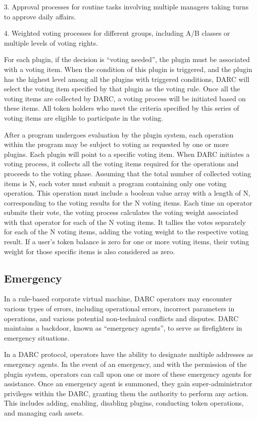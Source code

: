 \documentclass[main.tex]{subfiles}
\begin{document}
3. Approval processes for routine tasks involving multiple managers taking turns to approve daily affairs.

4. Weighted voting processes for different groups, including A/B classes or multiple levels of voting rights.

For each plugin, if the decision is ``voting needed'', the plugin must be associated with a voting item. When the condition of this plugin is triggered, and the plugin has the highest level among all the plugins with triggered conditions, DARC will select the voting item specified by that plugin as the voting rule. Once all the voting items are collected by DARC, a voting process will be initiated based on these items. All token holders who meet the criteria specified by this series of voting items are eligible to participate in the voting.

After a program undergoes evaluation by the plugin system, each operation within the program may be subject to voting as requested by one or more plugins. Each plugin will point to a specific voting item. When DARC initiates a voting process, it collects all the voting items required for the operations and proceeds to the voting phase. Assuming that the total number of collected voting items is N, each voter must submit a program containing only one voting operation. This operation must include a boolean value array with a length of N, corresponding to the voting results for the N voting items. Each time an operator submits their vote, the voting process calculates the voting weight associated with that operator for each of the N voting items. It tallies the votes separately for each of the N voting items, adding the voting weight to the respective voting result. If a user's token balance is zero for one or more voting items, their voting weight for those specific items is also considered as zero.

\subsection{Emergency}

In a rule-based corporate virtual machine, DARC operators may encounter various types of errors, including operational errors, incorrect parameters in operations, and various potential non-technical conflicts and disputes. DARC maintains a backdoor, known as ``emergency agents'', to serve as firefighters in emergency situations.

In a DARC protocol, operators have the ability to designate multiple addresses as emergency agents. In the event of an emergency, and with the permission of the plugin system, operators can call upon one or more of these emergency agents for assistance. Once an emergency agent is summoned, they gain super-administrator privileges within the DARC, granting them the authority to perform any action. This includes adding, enabling, disabling plugins, conducting token operations, and managing cash assets.
\end{document}

